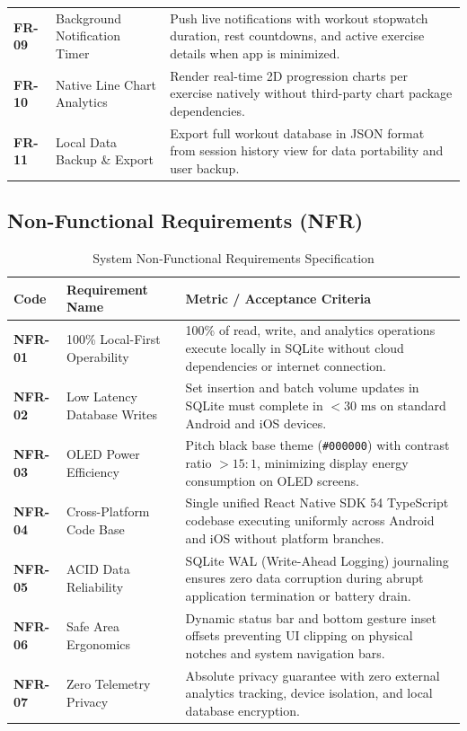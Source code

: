 \begin{table}[h!]
\begin{tabularx}{\textwidth}{l p{4.2cm} X}
\textbf{FR-09} & Background Notification Timer & Push live notifications with workout stopwatch duration, rest countdowns, and active exercise details when app is minimized. \\
\textbf{FR-10} & Native Line Chart Analytics & Render real-time 2D progression charts per exercise natively without third-party chart package dependencies. \\
\textbf{FR-11} & Local Data Backup \& Export & Export full workout database in JSON format from session history view for data portability and user backup. \\
\bottomrule
\end{tabularx}
\end{table}

\subsection{Non-Functional Requirements (NFR)}

\begin{table}[h!]
\centering
\small
\caption{System Non-Functional Requirements Specification}
\label{tab:non_functional_requirements}
\begin{tabularx}{\textwidth}{l p{4.5cm} X}
\toprule
\textbf{Code} & \textbf{Requirement Name} & \textbf{Metric / Acceptance Criteria} \\
\midrule
\textbf{NFR-01} & 100\% Local-First Operability & 100\% of read, write, and analytics operations execute locally in SQLite without cloud dependencies or internet connection. \\
\textbf{NFR-02} & Low Latency Database Writes & Set insertion and batch volume updates in SQLite must complete in $< 30\text{ ms}$ on standard Android and iOS devices. \\
\textbf{NFR-03} & OLED Power Efficiency & Pitch black base theme (\texttt{\#000000}) with contrast ratio $> 15:1$, minimizing display energy consumption on OLED screens. \\
\textbf{NFR-04} & Cross-Platform Code Base & Single unified React Native SDK 54 TypeScript codebase executing uniformly across Android and iOS without platform branches. \\
\textbf{NFR-05} & ACID Data Reliability & SQLite WAL (Write-Ahead Logging) journaling ensures zero data corruption during abrupt application termination or battery drain. \\
\textbf{NFR-06} & Safe Area Ergonomics & Dynamic status bar and bottom gesture inset offsets preventing UI clipping on physical notches and system navigation bars. \\
\textbf{NFR-07} & Zero Telemetry Privacy & Absolute privacy guarantee with zero external analytics tracking, device isolation, and local database encryption. \\
\bottomrule
\end{tabularx}
\end{table}
